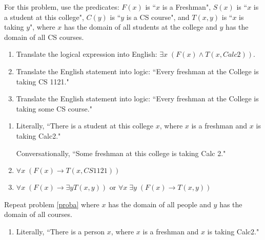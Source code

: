 \documentclass[12pt,addpoints]{exam}
\newcommand{\ra}{\rightarrow}
\begin{document}
\begin{questions}
\question[6]\label{proba} For this problem, use the predicates: $F(x)$ is ``$x$ is a Freshman", $S(x)$ is ``$x$ is a student at this college", $C(y)$ is ``$y$ is a CS course", and $T(x,y)$ is ``$x$ is taking $y$", where $x$ has the domain of all students at the college and $y$ has the domain of all CS courses.
\begin{enumerate}[label=(\alph*),itemsep=0pt,parsep=0pt,topsep=0pt,partopsep=0pt]
    \item Translate the logical expression into English: $\exists x\; (F(x) \wedge T(x,Calc2))$.
    \item Translate the English statement into logic: ``Every freshman at the College is taking CS 1121."
    \item Translate the English statement into logic: ``Every freshman at the College is taking some CS course."
\end{enumerate}
    \ifprintanswers
        \vspace{-10pt}
    \fi
\begin{solution}
    \begin{enumerate}[label=(\alph*),itemsep=0pt,parsep=0pt,topsep=0pt,partopsep=0pt]
        \item Literally, ``There is a student at this college $x$, where $x$ is a freshman and $x$ is taking Calc2."

            Conversationally, ``Some freshman at this college is taking Calc 2."
        \item $\forall x\; (F(x) \ra T(x,CS 1121))$
        \item $\forall x\; (F(x) \ra \exists y T(x,y))$ or $\forall x\; \exists y\; (F(x) \ra T(x,y))$
    \end{enumerate}
\end{solution}

\question[9] Repeat problem \ref{proba} where $x$ has the domain of all people and $y$ has the domain of all courses.
    \ifprintanswers
        \vspace{-10pt}
    \fi
\begin{solution}
    \begin{enumerate}[label=(\alph*),itemsep=0pt,parsep=0pt,topsep=0pt,partopsep=0pt]
        \item Literally, ``There is a person $x$, where $x$ is a freshman and $x$ is taking Calc2."


\end{enumerate}
\end{solution}
\end{questions}
\end{document}
